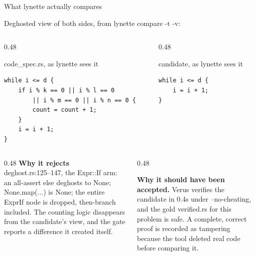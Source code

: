 \documentclass[aspectratio=169,10pt]{beamer}
\newcommand{\code}[1]{{\ttfamily #1}}
\newcommand{\hd}[1]{\textbf{\color{lgTeal}#1}}
\begin{document}
\begin{frame}[fragile]{What lynette actually compares}

{\scriptsize Deghosted view of both sides, from \code{lynette compare -t -v}:}

\vspace{3pt}
\begin{columns}[T]
\begin{column}{0.48\textwidth}
\begin{codebox}[lgTeal]{code\_spec.rs, as lynette sees it}
\begin{lstlisting}
while i <= d {
    if i % k == 0 || i % l == 0
        || i % m == 0 || i % n == 0 {
        count = count + 1;
    }
    i = i + 1;
}
\end{lstlisting}
\end{codebox}
\end{column}

\begin{column}{0.48\textwidth}
\begin{codebox}[lgRed]{candidate, as lynette sees it}
\begin{lstlisting}
while i <= d {
    i = i + 1;
}
\end{lstlisting}
\end{codebox}
\end{column}
\end{columns}

\vspace{6pt}
\begin{columns}[T]
\begin{column}{0.48\textwidth}
{\scriptsize
\hd{Why it rejects}\\
\code{deghost.rs:125--147}, the \code{Expr::If} arm: an all-assert \code{else} deghosts to
\code{None}; \code{None.map(...)} is \code{None}; the entire \code{ExprIf} node is dropped,
then-branch included. The counting logic disappears from the candidate's view, and the gate
reports a difference it created itself.
}
\end{column}

\begin{column}{0.48\textwidth}
\begin{callout}[lgGreen]
\scriptsize
\textbf{Why it should have been accepted.} Verus verifies the candidate in 0.4s under
\code{--no-cheating}, and the gold \code{verified.rs} for this problem is \code{safe}. A
complete, correct proof is recorded as tampering because the tool deleted real code before
comparing it.
\end{callout}
\end{column}
\end{columns}

\end{frame}
\end{document}

